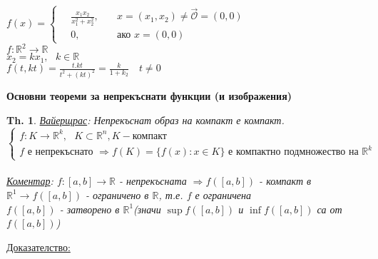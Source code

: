 \documentclass[12pt]{article}
\newcommand{\halfbox}[1]{\rbbox{#1}\quad}
\newtheorem{theorem}{Th.}
\newcommand{\spc}{\text{ }}
\begin{document}
	\halfbox{Пример} $f(x)= \begin{cases}
		\quad\frac{x_1x_2}{x_1^2+x_2^2},\quad &x=(x_1,x_2)\neq\overset{\rightarrow}{\mathcal{O}}=(0,0)\\
		\quad0,&\text{ако }x=(0,0)
	\end{cases}$\\
	$f:\mathbb{R}^2\rightarrow\mathbb{R}$\\
	$x_2 = kx_1,\spc k\in\mathbb{R}$\\
	$f(t,kt)=\frac{t.kt}{t^2+(kt)^2}=\frac{k}{1+k_2}\quad t\neq0$\\
	\newpage
	\begin{center}
		\textbf{Основни теореми за непрекъснати функции (и изображения)}
	\end{center}
	\begin{theorem}
		\underline{Вайерщрас}: Непрекъснат образ на компакт е компакт.\\
		$\begin{cases}
			f: K\rightarrow\mathbb{R}^k,\spc K\subset\mathbb{R}^n, K-\text{компакт}\\
			f \text{ е непрекъснато }\Rightarrow f(K) = \{f(x):x\in K\} \text{ е компактно подмножество на }\mathbb{R}^k
		\end{cases}$\\
		\\
		\underline{Коментар}: $f:[a,b]\rightarrow \mathbb{R}$ - непрекъсната $\Rightarrow f([a,b])$ - компакт в $\mathbb{R}^1\rightarrow f([a,b])$ - ограничено в $\mathbb{R}$, т.е. $f$ е ограничена\\
		$f([a,b])$ - затворено в $\mathbb{R}^1$(значи $\sup f([a,b])$ и $\inf f([a,b])$ са от $f([a,b])$)	
	\end{theorem}
	\underline{Доказателство:}
\end{document}
